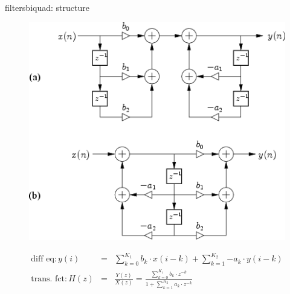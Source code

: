 	\begin{frame}{filters}{biquad: structure}
        \vspace{-3mm}
		\begin{figure}
			\centerline{\includegraphics[scale=.3]{graph/general_biquad_jos}}
		    \label{fig:general_biquad}
		\end{figure}
		\pause
		\vspace{-3mm}
		\begin{eqnarray*}
			\text{diff eq}: y(i) 	&=& \sum_{k=0}^{K_1}{b_k\cdot x(i-k)} + \sum_{k=1}^{K_2}{-a_k\cdot y(i-k)} \nonumber\\
			\text{trans. fct}: H(z) 	&=& \frac{Y(z)}{X(z)} =  \frac{\sum_{k=0}^{K_1}{b_k\cdot z^{-k}}}{1 + \sum_{k=1}^{K_2}{a_k\cdot z^{-k}}} 
		\end{eqnarray*}
	\end{frame}

